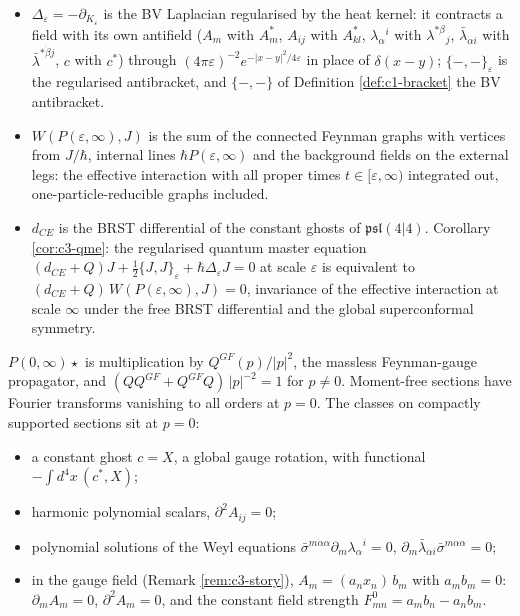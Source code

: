 \begin{remark}
\begin{itemize}
\item $\Delta_\varepsilon=-\partial_{K_\varepsilon}$ is the BV Laplacian regularised by the heat kernel: it contracts a field with its own antifield ($A_m$ with $A^*_m$, $A_{ij}$ with $A^*_{kl}$, $\lambda_\alpha{}^i$ with $\lambda^{*\beta}{}_j$, $\bar\lambda_{\dot\alpha i}$ with $\bar\lambda^{*\dot\beta j}$, $c$ with $c^*$) through $(4\pi\varepsilon)^{-2}e^{-|x-y|^2/4\varepsilon}$ in place of $\delta(x-y)$; $\{-,-\}_\varepsilon$ is the regularised antibracket, and $\{-,-\}$ of Definition \ref{def:c1-bracket} the BV antibracket.
\item $W(P(\varepsilon,\infty),J)$ is the sum of the connected Feynman graphs with vertices from $J/\hbar$, internal lines $\hbar P(\varepsilon,\infty)$ and the background fields on the external legs: the effective interaction with all proper times $t\in[\varepsilon,\infty)$ integrated out, one-particle-reducible graphs included.
\item $d_{CE}$ is the BRST differential of the constant ghosts of $\mathfrak{psl}(4|4)$. Corollary \ref{cor:c3-qme}: the regularised quantum master equation $(d_{CE}+Q)J+\tfrac12\{J,J\}_\varepsilon+\hbar\Delta_\varepsilon J=0$ at scale $\varepsilon$ is equivalent to $(d_{CE}+Q)\,W(P(\varepsilon,\infty),J)=0$, invariance of the effective interaction at scale $\infty$ under the free BRST differential and the global superconformal symmetry.
\end{itemize}
\end{remark}

\begin{remark}
$P(0,\infty)\star$ is multiplication by $Q^{GF}(p)/|p|^2$, the massless Feynman-gauge propagator, and $(QQ^{GF}+Q^{GF}Q)\,|p|^{-2}=1$ for $p\neq0$. Moment-free sections have Fourier transforms vanishing to all orders at $p=0$. The classes on compactly supported sections sit at $p=0$:
\begin{itemize}
\item a constant ghost $c=X$, a global gauge rotation, with functional $-\int d^4x\,(c^*,X)$;
\item harmonic polynomial scalars, $\partial^2A_{ij}=0$;
\item polynomial solutions of the Weyl equations $\bar\sigma^{m\dot\alpha\alpha}\partial_m\lambda_\alpha{}^i=0$, $\partial_m\bar\lambda_{\dot\alpha i}\bar\sigma^{m\dot\alpha\alpha}=0$;
\item in the gauge field (Remark \ref{rem:c3-story}), $A_m=(a_nx_n)\,b_m$ with $a_mb_m=0$: $\partial_mA_m=0$, $\partial^2A_m=0$, and the constant field strength $F^0_{mn}=a_mb_n-a_nb_m$.
\end{itemize}
\end{remark}

